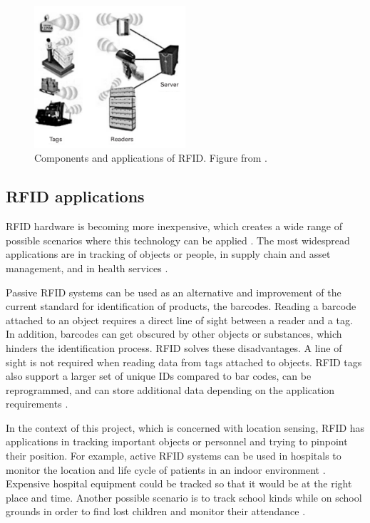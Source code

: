 \begin{figure}[h]
	\begin{center}
		\includegraphics[width=0.5\textwidth]{figures/rfidsys}
		\caption{Components and applications of RFID. Figure from \cite[p. 20]{Rida2010}.}
		\label{fig:rfidsys}
	\end{center}
\end{figure}

\subsection{RFID applications}
\label{sec:rfidapp}

RFID hardware is becoming more inexpensive, which creates a wide range of possible scenarios where this technology can be applied \cite{Nath2006}. The most widespread applications are in tracking of objects or people, in supply chain and asset management, and in health services \cite{Weinstein2005}.

Passive RFID systems can be used as an alternative and improvement of the current standard for identification of products, the barcodes.  Reading a barcode attached to an object requires a direct line of sight between a reader and a tag. In addition, barcodes can get obscured by other objects or substances, which hinders the identification process. RFID solves these disadvantages. A line of sight is not required when reading data from tags attached to objects. RFID tags also support a larger set of unique IDs compared to bar codes, can be reprogrammed, and can store additional data depending on the application requirements \cite{Weinstein2005}.

In the context of this project, which is concerned with location sensing, RFID has applications in tracking important objects or personnel and trying to pinpoint their position. For example, active RFID systems can be used in hospitals to monitor the location and life cycle of patients in an indoor environment \cite{Cangialosi2007}. Expensive hospital equipment could be tracked so that it would be at the right place and time. Another possible scenario is to track school kinds while on school grounds in order to find lost children and monitor their attendance \cite{Swartz2004}.

